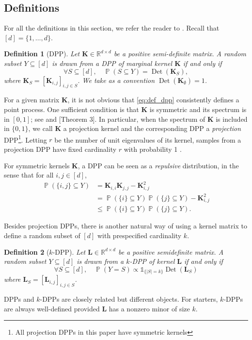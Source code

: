 \documentclass[twoside,11pt]{book}
\newtheorem{definition}{Definition}
\numberwithin{theorem}{chapter}
\numberwithin{definition}{chapter}
\numberwithin{proposition}{chapter}
\numberwithin{corollary}{chapter}
\numberwithin{example}{chapter}
\numberwithin{lemma}{chapter}
\numberwithin{assumption}{chapter}
\DeclareMathOperator{\Det}{Det}
\DeclareMathOperator{\Prb}{\mathbb{P}}
\begin{document}
\subsection{Definitions}
For all the definitions in this section, we refer the reader to \citep{KuTa12}. Recall that $[d] = \{1,\dots,d\}$.%
\begin{definition}[DPP]
Let $\bm{K} \in \mathbb{R}^{d\times d}$ be a positive semi-definite matrix.
A random subset $Y \subseteq [d]$ is drawn from a DPP of marginal kernel $\bm{K}$ if and only if
\begin{equation}\label{eq:def_dpp}
\forall S \subseteq [d],\quad \Prb(S \subseteq Y) = \Det(\bm{K}_{S}),
\end{equation}
where $\bm{K}_{S} = [\bm{K}_{i,j}]_{i,j \in S}$. We take as a convention $\Det(\bm{K}_{\emptyset}) = 1$.
\end{definition}
For a given matrix $\bm{K}$, it is not obvious that \eqref{eq:def_dpp} consistently defines a point process. One sufficient condition is that $\bm{K}$ is symmetric and its spectrum is in $[0,1]$; see \citep{Mac75} and \citep{Sos00}[Theorem 3]. In particular, when the spectrum of $\bm{K}$ is included in $\{0,1\}$, we call $\bm{K}$ a projection kernel and the corresponding DPP a \emph{projection} DPP\footnote{All projection DPPs in this paper have symmetric kernels}. Letting $r$ be the number of unit eigenvalues of its kernel, samples from a projection DPP have fixed cardinality $r$ with probability 1 \cite*[Lemma 17]{HoKrPeVi06}.

For symmetric kernels $\bm{K}$, a DPP can be seen as a \emph{repulsive} distribution, in the sense that for all $i,j\in [d]$,
\begin{align}
  \Prb(\{i,j\} \subseteq Y) &= \bm{K}_{i,i} \bm{K}_{j,j} - \bm{K}^2_{i,j}\\
  &= \Prb(\{i\} \subseteq Y)\Prb(\{j\} \subseteq Y) - \bm{K}^2_{i,j}\\
  &\leq \Prb(\{i\} \subseteq Y)\Prb(\{j\} \subseteq Y).
\end{align}

Besides projection DPPs, there is another natural way of using a kernel matrix to define a random subset of $[d]$ with prespecified cardinality $k$.
\begin{definition}[$k$-DPP]\label{def:kDPP}
Let $\bm{L} \in \mathbb{R}^{d\times d}$ be a positive semidefinite matrix.
A random subset $Y \subseteq [d]$ is drawn from a $k$-DPP of kernel $\bm{L}$ if and only if
\begin{equation}\label{eq:def_kdpp}
\forall S \subseteq [d],\quad \Prb(Y = S) \propto \mathbb{1}_{\{\vert S\vert = k\}}\Det(\bm{L}_{S})
\end{equation}
where $\bm{L}_{S} = [\bm{L}_{i,j}]_{i,j \in S}$.
\end{definition}
DPPs and $k$-DPPs are closely related but different objects. For starters, $k$-DPPs are always well-defined provided $\bm{L}$ has a nonzero minor of size $k$.
\end{document}

